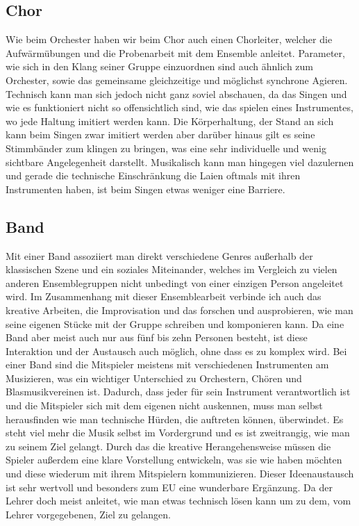 \subsection{Chor}
Wie beim Orchester haben wir beim Chor auch einen Chorleiter, welcher die
Aufwärmübungen und die Probenarbeit mit dem Ensemble anleitet. Parameter, wie
sich in den Klang seiner Gruppe einzuordnen sind auch ähnlich zum Orchester,
sowie das gemeinsame gleichzeitige und möglichst synchrone Agieren. Technisch
kann man sich jedoch nicht ganz soviel abschauen, da das Singen und wie es
funktioniert nicht so offensichtlich sind, wie das spielen eines Instrumentes,
wo jede Haltung imitiert werden kann. Die Körperhaltung, der Stand an sich kann
beim Singen zwar imitiert werden aber darüber hinaus gilt es seine Stimmbänder zum
klingen zu bringen, was eine sehr individuelle und wenig sichtbare Angelegenheit
darstellt. Musikalisch kann man hingegen viel dazulernen und gerade die
technische Einschränkung die Laien oftmals mit ihren Instrumenten haben, ist
beim Singen etwas weniger eine Barriere.


\subsection{Band}
Mit einer Band assoziiert man direkt verschiedene Genres außerhalb der
klassischen Szene und ein soziales Miteinander, welches im Vergleich zu vielen
anderen Ensemblegruppen nicht unbedingt von einer einzigen Person angeleitet wird. 
Im Zusammenhang mit dieser Ensemblearbeit verbinde ich auch das kreative
Arbeiten, die Improvisation und das forschen und ausprobieren, wie man seine
eigenen Stücke mit der Gruppe schreiben und komponieren kann. Da eine Band aber
meist auch nur aus fünf bis zehn Personen besteht, ist diese Interaktion und der
Austausch auch möglich, ohne dass es zu komplex wird.
Bei einer Band sind die Mitspieler meistens mit verschiedenen Instrumenten am
Musizieren, was ein wichtiger Unterschied zu Orchestern, Chören und
Blasmusikvereinen ist. Dadurch, dass jeder für sein Instrument verantwortlich
ist und die Mitspieler sich mit dem eigenen nicht auskennen, muss man selbst
herausfinden wie man technische Hürden, die auftreten können, überwindet. Es
steht viel mehr die Musik selbst im Vordergrund und es ist zweitrangig, wie man
zu seinem Ziel gelangt. Durch das die kreative Herangehensweise müssen die
Spieler außerdem eine klare Vorstellung entwickeln, was sie wie haben möchten
und diese wiederum mit ihrem Mitspielern kommunizieren. Dieser Ideenaustausch
ist sehr wertvoll und besonders zum EU eine wunderbare Ergänzung. Da der Lehrer doch meist anleitet, wie
man etwas technisch lösen kann um zu dem, vom Lehrer vorgegebenen, Ziel zu
gelangen. 


